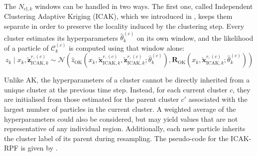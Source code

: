 The $N_{\mathrm{cl},k}$ windows can be handled in two ways. The first one, called Independent Clustering Adaptive Kriging (ICAK), which we introduced in \cite{bib:AK-PF-clustered}, keeps them separate in order to preserve the locality induced by the clustering step. Every cluster estimates its hyperparameters $\hat{\theta}_k^{(c)}$ on its own window, and the likelihood of a particle of $\mathcal{C}_k^{(c)}$ is computed using that window alone:
\begin{equation}
	z_k\mid x_k,\tilde{\mathbf{z}}_{\mathrm{ICAK},k}^{r,(c)}\sim\mathcal{N}\left(\hat{z}_{\mathrm{OK}}\left(x_k,\tilde{\mathbf{x}}_{\mathrm{ICAK},k}^{r,(c)},\tilde{\mathbf{z}}_{\mathrm{ICAK},k}^{r,(c)};\hat{\theta}_k^{(c)}\right),\mathbf{R}_{\mathrm{OK}}\left(x_k,\tilde{\mathbf{x}}_{\mathrm{ICAK},k}^{r,(c)};\hat{\theta}_k^{(c)}\right)\right)\label{eq:ICAK_likelihood}
\end{equation}

Unlike AK, the hyperparameters of a cluster cannot be directly inherited from a unique cluster at the previous time step. Instead, for each current cluster $c$, they are initialised from those estimated for the parent cluster $c'$ associated with the largest number of particles in the current cluster. A weighted average of the hyperparameters could also be considered, but may yield values that are not representative of any individual region. Additionally, each new particle inherits the cluster label of its parent during resampling. The pseudo-code for the ICAK-RPF is given by .

